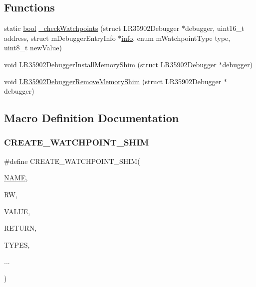 \subsection*{Functions}
\begin{DoxyCompactItemize}
\item 
static \mbox{\hyperlink{libretro_8h_a4a26dcae73fb7e1528214a068aca317e}{bool}} \mbox{\hyperlink{lr35902_2debugger_2memory-debugger_8c_afbc9d616dc0d5cce0c985e3f53fbbff8}{\+\_\+check\+Watchpoints}} (struct L\+R35902\+Debugger $\ast$debugger, uint16\+\_\+t address, struct m\+Debugger\+Entry\+Info $\ast$\mbox{\hyperlink{libretro_8h_a283ad41e4809f9c0ebe736a9861d8a91}{info}}, enum m\+Watchpoint\+Type type, uint8\+\_\+t new\+Value)
\item 
void \mbox{\hyperlink{lr35902_2debugger_2memory-debugger_8c_a0bd5023fb705b2c236d1d7d914e065fa}{L\+R35902\+Debugger\+Install\+Memory\+Shim}} (struct L\+R35902\+Debugger $\ast$debugger)
\item 
void \mbox{\hyperlink{lr35902_2debugger_2memory-debugger_8c_a2c84c9eab16fbb97967df0f2fd5b7614}{L\+R35902\+Debugger\+Remove\+Memory\+Shim}} (struct L\+R35902\+Debugger $\ast$debugger)
\end{DoxyCompactItemize}


\subsection{Macro Definition Documentation}
\mbox{\label{lr35902_2debugger_2memory-debugger_8c_a476513de7d3b509e146bd83f1b2fa25f}} 
\subsubsection{\texorpdfstring{C\+R\+E\+A\+T\+E\+\_\+\+W\+A\+T\+C\+H\+P\+O\+I\+N\+T\+\_\+\+S\+H\+IM}{CREATE\_WATCHPOINT\_SHIM}}
{\footnotesize\ttfamily \#define C\+R\+E\+A\+T\+E\+\_\+\+W\+A\+T\+C\+H\+P\+O\+I\+N\+T\+\_\+\+S\+H\+IM(\begin{DoxyParamCaption}\item[{}]{\mbox{\hyperlink{inflate_8h_a164ea0159d5f0b5f12a646f25f99eceaa67bc2ced260a8e43805d2480a785d312}{N\+A\+ME}},  }\item[{}]{RW,  }\item[{}]{V\+A\+L\+UE,  }\item[{}]{R\+E\+T\+U\+RN,  }\item[{}]{T\+Y\+P\+ES,  }\item[{}]{... }\end{DoxyParamCaption})}

